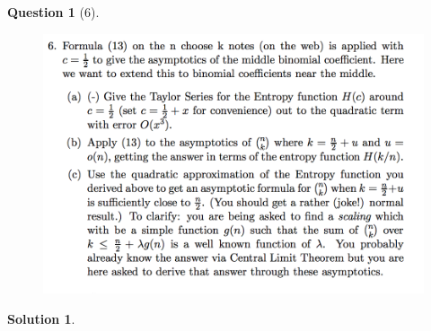 \documentclass{article} %
\theoremstyle{quest}
\newtheorem*{question}{Question}
\newtheorem*{solution}{Solution}
\begin{document}
\pagebreak

\begin{question}[6]
\hfill
\begin{figure}[h!]
  \centering
    \includegraphics[width=1\textwidth]{pm-1-6.png}
\end{figure}
\end{question}
\begin{solution} 

 
\end{solution}
\end{document}
